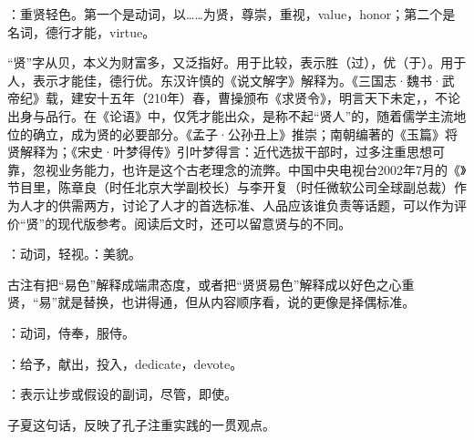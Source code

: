 {
\item {}：重贤轻色。第一个是动词，以……为贤，尊崇，重视，value，honor；第二个是名词，德行才能，virtue。

“贤”字从贝，本义为财富多，又泛指好。用于比较，表示胜（过），优（于）。用于人，表示才能佳，德行优。东汉许慎的《说文解字》解释为。《三国志·魏书·武帝纪》载，建安十五年（210年）春，曹操颁布《求贤令》，明言天下未定，，不论出身与品行。在《论语》中，仅凭才能出众，是称不起“贤人”的，随着儒学主流地位的确立，成为贤的必要部分。《孟子·公孙丑上》推崇；南朝编著的《玉篇》将贤解释为；《宋史·叶梦得传》引叶梦得言：近代选拔干部时，过多注重思想可靠，忽视业务能力，也许是这个古老理念的流弊。中国中央电视台2002年7月的《》节目里，陈章良（时任北京大学副校长）与李开复（时任微软公司全球副总裁）作为人才的供需两方，讨论了人才的首选标准、人品应该谁负责等话题，可以作为评价“贤”的现代版参考。阅读后文时，还可以留意贤与的不同。

：动词，轻视。：美貌。

古注有把“易色”解释成端肃态度，或者把“贤贤易色”解释成以好色之心重贤，“易”就是替换，也讲得通，但从内容顺序看，说的更像是择偶标准。

\item {}：动词，侍奉，服侍。

\item {}：给予，献出，投入，dedicate，devote。
\item {}：表示让步或假设的副词，尽管，即使。

子夏这句话，反映了孔子注重实践的一贯观点。  
}
{}


